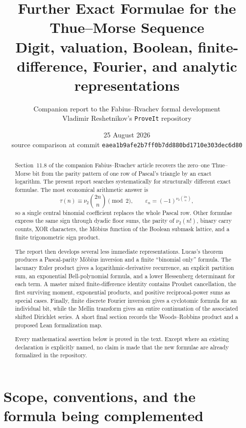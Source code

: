 \documentclass[11pt,oneside]{article}
\title{\bfseries Further Exact Formulae for the Thue--Morse Sequence\\[0.35em]
\large Digit, valuation, Boolean, finite-difference, Fourier, and analytic representations}
\author{Companion report to the Fabius--Rvachev formal development\\
\small Vladimir Reshetnikov's \texttt{ProveIt} repository}
\date{25 August 2026\\
\small source comparison at commit \nolinkurl{eaea1b9afe2b7ff0b7dd880bd1710e303dec6d80}}
\theoremstyle{definition}
\theoremstyle{remark}
\newcommand{\vtwo}{\nu_2}
\begin{document}
\maketitle

\begin{abstract}
Section~11.8 of the companion Fabius--Rvachev article recovers the zero--one
Thue--Morse bit from the parity pattern of one row of Pascal's triangle by an
exact logarithm.  The present report searches systematically for structurally
different exact formulae.  The most economical arithmetic answer is
\[
  \tau(n)\equiv \vtwo\binom{2n}{n}\pmod2,
  \qquad
  \varepsilon_n=(-1)^{\vtwo\binom{2n}{n}},
\]
so a single central binomial coefficient replaces the whole Pascal row.  Other
formulae express the same sign through dyadic floor sums, the parity of
$\vtwo(n!)$, binary carry counts, XOR characters, the Möbius function of the
Boolean submask lattice, and a finite trigonometric sign product.

The report then develops several less immediate representations.  Lucas's
theorem produces a Pascal-parity Möbius inversion and a finite ``binomial only''
formula.  The lacunary Euler product gives a logarithmic-derivative recurrence,
an explicit partition sum, an exponential Bell-polynomial formula, and a lower
Hessenberg determinant for each term.  A master mixed finite-difference identity
contains Prouhet cancellation, the first surviving moment, exponential products,
and positive reciprocal-power sums as special cases.  Finally, finite discrete
Fourier inversion gives a cyclotomic formula for an individual bit, while the
Mellin transform gives an entire continuation of the associated shifted
Dirichlet series.  A short final section records the Woods--Robbins product and
a proposed Lean formalization map.

Every mathematical assertion below is proved in the text.  Except where an
existing declaration is explicitly named, no claim is made that the new
formulae are already formalized in the repository.
\end{abstract}

\tableofcontents
\newpage

\section{Scope, conventions, and the formula being complemented}
\label{sec:scope}
\end{document}
